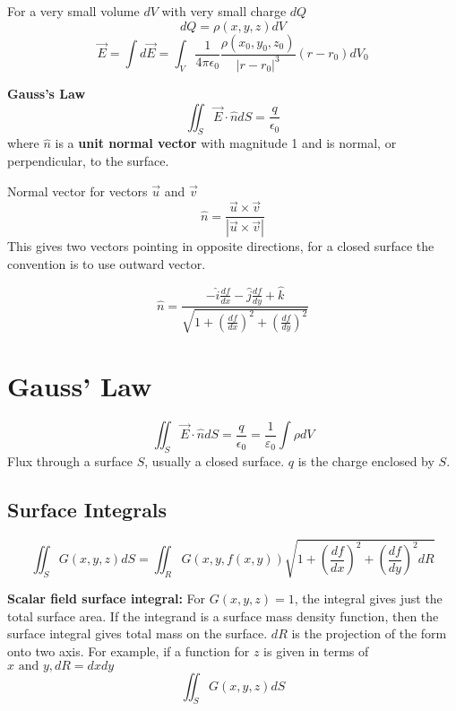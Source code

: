 For a very small volume $dV$ with very small charge $dQ$
\begin{equation}
	\label{}
	dQ=\rho(x,y,z)dV
\end{equation}
\begin{equation}
	\label{}
	\vec{E}=\int d\vec{E}=\int_{V}\frac{1}{4\pi\epsilon_{0}}\frac{\rho(x_{0},y_{0},z_{0})}{|r-r_{0}|^{3}}(r-r_{0})dV_{0}
\end{equation}

\textbf{Gauss's Law}
\begin{equation}
	\label{}
	\iint_{S}\vec{E}\cdot\hat{n}dS=\frac{q}{\epsilon_{0}}
\end{equation}
where $\hat{n}$ is a \textbf{unit normal vector} with magnitude 1 and is normal, or perpendicular, to the surface.

Normal vector for vectors $\vec{u}$ and $\vec{v}$
\begin{equation}
	\label{}
	\hat{n}=\frac{\vec{u}\times \vec{v}}{|\vec{u}\times \vec{v}|}
\end{equation}
This gives two vectors pointing in opposite directions, for a closed surface the convention is to use outward vector.

\begin{equation}
	\label{}
	\hat{n}=\frac{-\hat{i}\frac{df}{dx}-\hat{j}\frac{df}{dy}+\hat{k}}{\sqrt{1+(\frac{df}{dx})^{2}+(\frac{df}{dy})^{2}}}
\end{equation}

\section{Gauss' Law}
\begin{equation}
	\label{}
	\iint_{S}\vec{E}\cdot\hat{n}dS=\frac{q}{\epsilon_{0}}=\frac{1}{\varepsilon_0}\int\rho dV
\end{equation}
Flux through a surface $S$, usually a closed surface. $q$ is the charge enclosed by $S$.


\subsection{Surface Integrals}
\begin{equation}
	\label{}
\iint_{S}G(x,y,z)dS=\iint_{R}G(x,y,f(x,y))\sqrt{1+(\frac{df}{dx})^{2}+{(\frac{df}{dy})}^{2}dR}
\end{equation}

\textbf{Scalar field surface integral: } For $G(x,y,z)=1$, the integral gives just the total surface area. If the integrand is a surface mass density function, then the surface integral gives total mass on the surface. $ dR $ is the projection of the form onto two axis. For example, if a function for $ z $ is given in terms of $ x\text{ and }y, dR=dxdy$
\begin{equation}
	\label{}
	\iint_{S}G(x,y,z)dS
\end{equation}

